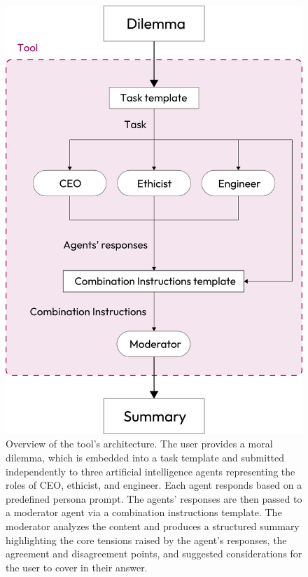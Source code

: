 \begin{figure}[h]
  \centering
  \includegraphics[width=\linewidth]{impl}
  \caption{Overview of the tool's architecture. The user provides a moral dilemma, which is embedded into a task template and submitted independently to three artificial intelligence agents representing the roles of CEO, ethicist, and engineer. Each agent responds based on a predefined persona prompt. The agents' responses are then passed to a moderator agent via a combination instructions template. The moderator analyzes the content and produces a structured summary highlighting the core tensions raised by the agent's responses, the agreement and disagreement points, and suggested considerations for the user to cover in their answer.}
  \label{fig:impl}
\end{figure}

